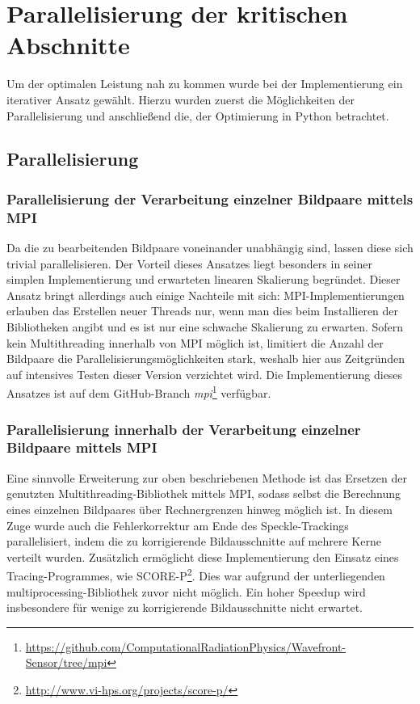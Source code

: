 \chapter{Parallelisierung der kritischen Abschnitte}

Um der optimalen Leistung nah zu kommen wurde bei der Implementierung ein iterativer Ansatz gewählt. Hierzu wurden zuerst die Möglichkeiten der Parallelisierung und anschließend die, der Optimierung in Python betrachtet. 

\section{Parallelisierung}

\subsection{Parallelisierung der Verarbeitung einzelner Bildpaare mittels MPI}

Da die zu bearbeitenden Bildpaare voneinander unabhängig sind, lassen diese sich trivial parallelisieren. Der Vorteil dieses Ansatzes liegt besonders in seiner simplen Implementierung und erwarteten linearen Skalierung begründet. Dieser Ansatz bringt allerdings auch einige Nachteile mit sich: \gls{MPI}-Implementierungen erlauben das Erstellen neuer Threads nur, wenn man dies beim Installieren der Bibliotheken angibt und es ist nur eine schwache Skalierung zu erwarten. Sofern kein Multithreading innerhalb von \gls{MPI} möglich ist, limitiert die Anzahl der Bildpaare die Parallelisierungsmöglichkeiten stark, weshalb hier aus Zeitgründen auf intensives Testen dieser Version verzichtet wird. Die Implementierung dieses Ansatzes ist auf dem GitHub-Branch \textit{mpi}\footnote{\url{https://github.com/ComputationalRadiationPhysics/Wavefront-Sensor/tree/mpi}} verfügbar.

\subsection{Parallelisierung innerhalb der Verarbeitung einzelner Bildpaare mittels MPI}

Eine sinnvolle Erweiterung zur oben beschriebenen Methode ist das Ersetzen der genutzten Multithreading-Bibliothek mittels MPI, sodass selbst die Berechnung eines einzelnen Bildpaares über Rechnergrenzen hinweg möglich ist. In diesem Zuge wurde auch die Fehlerkorrektur am Ende des Speckle-Trackings parallelisiert, indem die zu korrigierende Bildausschnitte auf mehrere Kerne verteilt wurden. Zusätzlich ermöglicht diese Implementierung den Einsatz eines Tracing-Programmes, wie SCORE-P\footnote{\url{http://www.vi-hps.org/projects/score-p/}}. Dies war aufgrund der unterliegenden multiprocessing-Bibliothek zuvor nicht möglich. Ein hoher Speedup wird insbesondere für wenige zu korrigierende Bildausschnitte nicht erwartet. 

